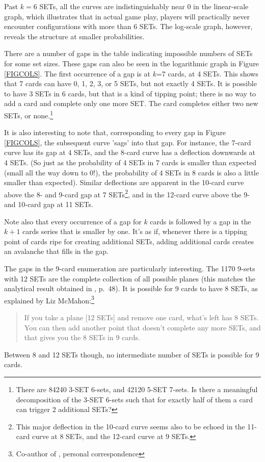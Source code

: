\documentclass[10pt]{amsart}
\begin{document}
Past $k=6$ SETs, all the curves are indistinguishably near 0 in the linear-scale
graph, which illustrates that in actual game play, players will practically
never encounter configurations with more than 6 SETs. The log-scale graph,
however, reveals the structure at smaller probabilities.

There are a number of gaps in the table indicating impossible numbers of SETs
for some set sizes. These gaps can also be seen in the logarithmic graph in
Figure \ref{FIGCOLS}. The first occurrence of a gap is at $k$=7 cards, at 4
SETs. This shows that 7 cards can have 0, 1, 2, 3, or 5 SETs, but not exactly 4
SETs. It is possible to have 3 SETs in 6 cards, but that is a kind of tipping
point; there is no way to add a  card and complete only one more SET. The
 card completes either two new SETs, or none.\footnote{There are 84240
  3-SET 6-sets, and 42120 5-SET 7-sets. Is there a meaningful decomposition of
  the 3-SET 6-sets such that for exactly half of them a  card can trigger
  2 additional SETs?}

It is also interesting to note that, corresponding to every gap in Figure
\ref{FIGCOLS}, the subsequent curve 'sags' into that gap. For instance, the
7-card curve has its gap at 4 SETs, and the 8-card curve has a deflection
downwards at 4 SETs. (So just as the probability of 4 SETs in 7 cards is smaller
than expected (small all the way down to 0!), the probability of 4 SETs in 8
cards is also a little smaller than expected). Similar deflections are apparent
in the 10-card curve above the 8- and 9-card gap at 7 SETs\footnote{This major
  deflection in the 10-card curve seems also to be echoed in the 11-card curve
  at 8 SETs, and the 12-card curve at 9 SETs.}, and in the 12-card curve above
the 9- and 10-card gap at 11 SETs.

Note also that every occurrence of a gap for $k$ cards is followed by a gap in
the $k+1$ cards series that is smaller by one. It's as if, whenever there is a
tipping point of cards ripe for creating additional SETs, adding additional
cards creates an avalanche that fills in the gap.

The gaps in the 9-card enumeration are particularly interesting. The 1170 9-sets
with 12 SETs are the complete collection of all possible planes (this matches
the analytical result obtained in \cite{JOS}, p.~48). It is possible for 9 cards
to have 8 SETs, as explained by Liz McMahon:\footnote{Co-author of \cite{JOS},
  personal correspondence}
\begin{quote}
If you take a plane [12 SETs] and remove one card, what's left has 8 SETs.  You
can then add another point that doesn't complete any more SETs, and that gives
you the 8 SETs in 9 cards.
\end{quote}
Between 8 and 12 SETs though, no intermediate number of SETs is possible for 9
cards.
\end{document}

